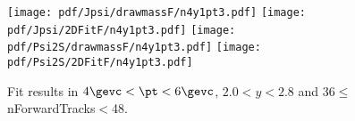 \begin{figure}[H]
\begin{center}
\texttt{[image: pdf/Jpsi/drawmassF/n4y1pt3.pdf]}
\texttt{[image: pdf/Jpsi/2DFitF/n4y1pt3.pdf]}
\vspace*{-0.5cm}
\texttt{[image: pdf/Psi2S/drawmassF/n4y1pt3.pdf]}
\texttt{[image: pdf/Psi2S/2DFitF/n4y1pt3.pdf]}
\vspace*{-0.5cm}
\end{center}
\caption{Fit results in $4\gevc<\pt<6\gevc$, $2.0<y<2.8$ and 36$\leq$nForwardTracks$<$48.}
\label{Fitn4y1pt3}
\end{figure}
